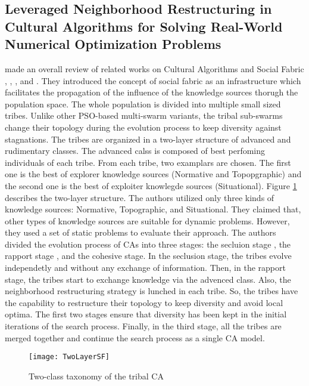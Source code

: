\subsection{Leveraged Neighborhood Restructuring in Cultural Algorithms for Solving Real-World Numerical Optimization Problems}
\citet{ali2016leveraged} made an overall review of related works on Cultural Algorithms and Social Fabric \citet{peng2005knowledge}, \citet{reynolds2008social}, \citet{chen2006tribe}, and \citet{785509}. They introduced the concept of social fabric as an infrastructure which facilitates the propagation of the influence of the knowledge sources thorugh the population space. The whole population is divided into multiple small sized tribes. Unlike other PSO-based multi-swarm variants, the tribal sub-swarms change their topology during the evolution process to keep diversity against stagnations.\newline
The tribes are organized in a two-layer structure of advanced and rudimentary classes. The advanced calss is composed of best perfoming individuals of each tribe. From each tribe, two examplars are chosen. The first one is the best of explorer knowledge sources (Normative and Topopgraphic) and the second one is the best of exploiter knowlegde sources (Situational). Figure \ref{fig:TwoLayerSF} describes the two-layer structure. The authors utilized only three kinds of knowledge sources: Normative, Topographic, and Situational. They claimed that, other types of knowledge sources are suitable for dynamic problems. However, they used a set of static problems to evaluate their approach. The authors divided the evolution process of CAs into three stages: the secluion stage , the rapport stage , and the cohesive stage. In the seclusion stage, the tribes evolve independetly and without any exchange of information. Then, in the rapport stage, the tribes start to exchange knowledge via the advenced class. Also, the neighborhood restructuring strategy is lunched in each tribe. So, the tribes have the capability to restructure their topology to keep diversity and avoid local optima. The first two stages ensure that diversity has been kept in the initial iterations of the search process. Finally, in the third stage, all the tribes are merged together and continue the search process as a single CA model.
\begin{figure}[h]
	\texttt{[image: TwoLayerSF]}
	\centering
	\caption{Two-class taxonomy of the tribal CA \citet{ali2016leveraged}}
	\label{fig:TwoLayerSF}
\end{figure}
